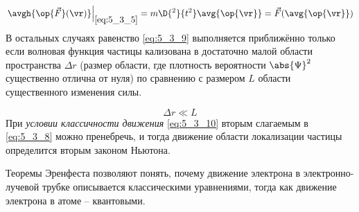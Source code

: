 \begin{equation}
\label{eq:5_3_9}
  \left. \avgh{\op{\vec{F}}(\vr)} \right|_{
    \eqref{eq:5_3_5}
  } = m \D{^2}{t^2} \avg{\op{\vr}} = \vec{F}(\avg{\op{\vr}})
\end{equation}%
%
В остальных случаях равенство \eqref{eq:5_3_9} выполняется приближённо только если волновая функция частицы кализована в достаточно малой области пространства $\Delta r$ (размер области, где плотность вероятности $\abs{\Psi}^2$ существенно отлична от нуля) по сравнению с размером $L$ области существенного изменения силы.

\begin{equation}
\label{eq:5_3_10}
\Delta r \ll L
\end{equation}%
%
При {\em условии классичности движения} \eqref{eq:5_3_10} вторым слагаемым в \eqref{eq:5_3_8} можно пренебречь, и тогда движение области локализации частицы определится вторым законом Ньютона.

Теоремы Эренфеста позволяют понять, почему движение электрона в электронно-лучевой трубке описывается классическими уравнениями, тогда как движение электрона в атоме -- квантовыми.
